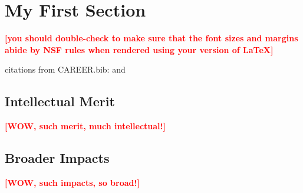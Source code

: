 \documentclass[11pt,oneside,onecolumn,letterpaper]{article}
\newcommand{\todo}[1]{\textcolor{red}{\textbf{[#1]}}}
\begin{document}
\section{My First Section}

\todo{you should double-check to make sure that the font sizes and
margins abide by NSF rules when rendered using your version of LaTeX}

citations from CAREER.bib: \cite{GuoCHI2017} and \cite{GuoCHI2018}


\subsection{Intellectual Merit}

\todo{WOW, such merit, much intellectual!}

\subsection{Broader Impacts}

\todo{WOW, such impacts, so broad!}



%
{\vbox{}}
\end{document}
